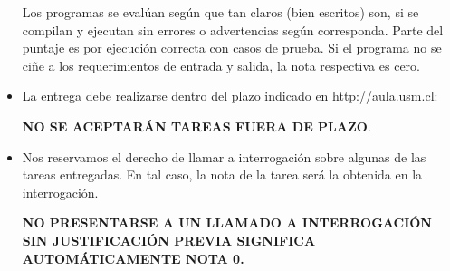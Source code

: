 \begin{itemize}
    Los programas se evalúan según que tan claros
    (bien escritos)
    son, si se compilan y ejecutan sin errores o advertencias según corresponda.
    Parte del puntaje es por ejecución correcta con casos de prueba.
    Si el programa no se ciñe a los requerimientos de entrada y salida,
    la nota respectiva es cero.
\fi    
  \item
    La entrega debe realizarse dentro del plazo indicado en \url{http://aula.usm.cl}:

    \begin{center}
        \Large{
          \textbf{NO SE ACEPTARÁN TAREAS FUERA DE PLAZO}.
        }
        \normalsize
    \end{center}
     
    
  \item
    Nos reservamos el derecho de llamar a interrogación
    sobre algunas de las tareas entregadas.
    En tal caso,
    la nota de la tarea será la obtenida en la interrogación.
    \begin{center}
      \Large{
        \textbf{NO PRESENTARSE A UN LLAMADO A INTERROGACIÓN SIN JUSTIFICACIÓN PREVIA SIGNIFICA AUTOMÁTICAMENTE NOTA 0.}
      }
    \end{center}
    
  \end{itemize}


  
